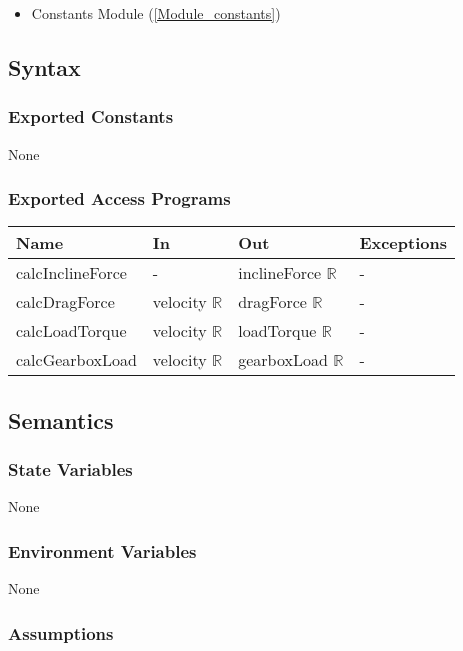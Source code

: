 \documentclass[12pt, titlepage]{article}
\begin{document}
\begin{itemize}
  \item Constants Module (\ref{Module_constants})
\end{itemize}

\subsection{Syntax}

\subsubsection{Exported Constants}
None

\subsubsection{Exported Access Programs}

\begin{center}
\begin{tabular}{p{4cm} p{4cm} p{4cm} p{2cm}}
\hline
\textbf{Name} & \textbf{In} & \textbf{Out} & \textbf{Exceptions} \\
\hline
calcInclineForce & - & inclineForce $\mathbb{R}$ & - \\
calcDragForce & velocity $\mathbb{R}$ & dragForce $\mathbb{R}$ & - \\
calcLoadTorque & velocity $\mathbb{R}$ & loadTorque $\mathbb{R}$ & - \\
calcGearboxLoad & velocity $\mathbb{R}$ & gearboxLoad $\mathbb{R}$ & - \\
\hline
\end{tabular}
\end{center}

\subsection{Semantics}

\subsubsection{State Variables}

None

\subsubsection{Environment Variables}

None

\subsubsection{Assumptions}
\end{document}
